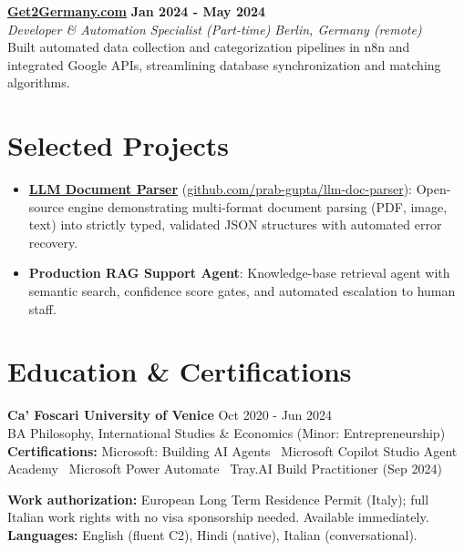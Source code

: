 \documentclass[a4paper,10pt]{article}
\newcommand{\role}[4]{%
  \textbf{#1} \hfill \textbf{#2}\\[1pt]%
  \textit{#3} \hfill \textit{#4}\\[2pt]%
}
\begin{document}
\role{\href{https://get2germany.com}{Get2Germany.com}}{Jan 2024 - May 2024}{Developer \& Automation Specialist (Part-time)}{Berlin, Germany (remote)}
Built automated data collection and categorization pipelines in n8n and integrated Google APIs, streamlining database synchronization and matching algorithms.

\section{Selected Projects}
\begin{itemize}
  \item \textbf{\href{https://github.com/prab-gupta/llm-doc-parser}{LLM Document Parser}} (\href{https://github.com/prab-gupta/llm-doc-parser}{github.com/prab-gupta/llm-doc-parser}): Open-source engine demonstrating multi-format document parsing (PDF, image, text) into strictly typed, validated JSON structures with automated error recovery.
  \item \textbf{Production RAG Support Agent}: Knowledge-base retrieval agent with semantic search, confidence score gates, and automated escalation to human staff.
\end{itemize}

\section{Education \& Certifications}
\textbf{Ca' Foscari University of Venice} \hfill Oct 2020 - Jun 2024\\
BA Philosophy, International Studies \& Economics (Minor: Entrepreneurship)\\[1pt]
\textbf{Certifications:} Microsoft: Building AI Agents \textbullet\ Microsoft Copilot Studio Agent Academy \textbullet\ Microsoft Power Automate \textbullet\ Tray.AI Build Practitioner (Sep 2024)

\vspace{2pt}
{\small \textbf{Work authorization:} European Long Term Residence Permit (Italy); full Italian work rights with no visa sponsorship needed. Available immediately. \quad \textbf{Languages:} English (fluent C2), Hindi (native), Italian (conversational).}
\end{document}
